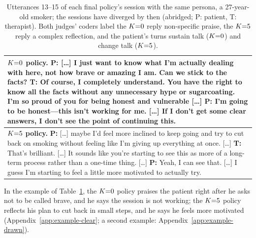 \begin{table}[t]
\centering
\footnotesize
\setlength{\tabcolsep}{3pt}
\begin{tabular}{@{}p{}@{}}
\toprule
\boldmath$K{=}0$\textbf{ policy.} \textbf{P:} [\ldots] I just want to know what I'm actually dealing
with here, not how brave or amazing I am. Can we stick to the facts? \textbf{T:} Of course, I
completely understand. You have the right to know all the facts without any unnecessary hype or
sugarcoating. I'm so proud of you for being honest and vulnerable [\ldots] \textbf{P:} I'm going to
be honest---this isn't working for me. [\ldots] If I don't get some clear answers, I don't see the
point of continuing this.\\
\midrule
\boldmath$K{=}5$\textbf{ policy.} \textbf{P:} [\ldots] maybe I'd feel more inclined to keep going and
try to cut back on smoking without feeling like I'm giving up everything at once. [\ldots]
\textbf{T:} That's brilliant. [\ldots] It sounds like you're starting to see this as more of a
long-term process rather than a one-time thing. [\ldots] \textbf{P:} Yeah, I can see that.
[\ldots] I guess I'm starting to feel a little more motivated to actually try.\\
\bottomrule
\end{tabular}
\caption{Utterances 13--15 of each final policy's session with the same persona, a 27-year-old
smoker; the sessions have diverged by then (abridged; P: patient, T: therapist). Both judges' coders
label the $K{=}0$ reply non-specific praise, the $K{=}5$ reply a complex reflection, and the patient's
turns sustain talk ($K{=}0$) and change talk ($K{=}5$).}
\label{tab:excerpt}
\end{table}

In the example of Table~\ref{tab:excerpt}, the $K{=}0$ policy praises the patient right after he asks
not to be called brave, and he says the session is not working; the $K{=}5$ policy reflects his plan
to cut back in small steps, and he says he feels more motivated (Appendix~\ref{app:example-clear};
a second example: Appendix~\ref{app:example-drawn}).

